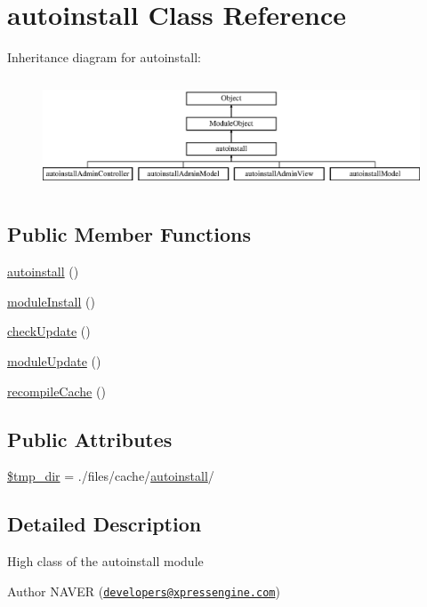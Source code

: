 \hypertarget{classautoinstall}{}\section{autoinstall Class Reference}
\label{classautoinstall}
Inheritance diagram for autoinstall\+:\begin{figure}[H]
\begin{center}
\leavevmode
\includegraphics[height=3.353293cm]{classautoinstall}
\end{center}
\end{figure}
\subsection*{Public Member Functions}
\begin{DoxyCompactItemize}
\item 
\hyperlink{classautoinstall_aa76d5fcbf6ac9450b810acefa4b85a51}{autoinstall} ()
\item 
\hyperlink{classautoinstall_ad783aa6031577dca5fdcc7f6ea61f452}{module\+Install} ()
\item 
\hyperlink{classautoinstall_a74f260b0d1254c8e4dbd69b532072a95}{check\+Update} ()
\item 
\hyperlink{classautoinstall_a856f1e61cac8e20ed0df58a6a10f61a8}{module\+Update} ()
\item 
\hyperlink{classautoinstall_a7455962a1f07ea4c4e28971fa8dde715}{recompile\+Cache} ()
\end{DoxyCompactItemize}
\subsection*{Public Attributes}
\begin{DoxyCompactItemize}
\item 
\hyperlink{classautoinstall_a157882a0b8cc81818aa516880f2ba5dc}{\$tmp\+\_\+dir} = \textquotesingle{}./files/cache/\hyperlink{classautoinstall}{autoinstall}/\textquotesingle{}
\end{DoxyCompactItemize}


\subsection{Detailed Description}
High class of the autoinstall module \begin{DoxyAuthor}{Author}
N\+A\+V\+E\+R (\href{mailto:developers@xpressengine.com}{\tt developers@xpressengine.\+com}) 
\end{DoxyAuthor}


